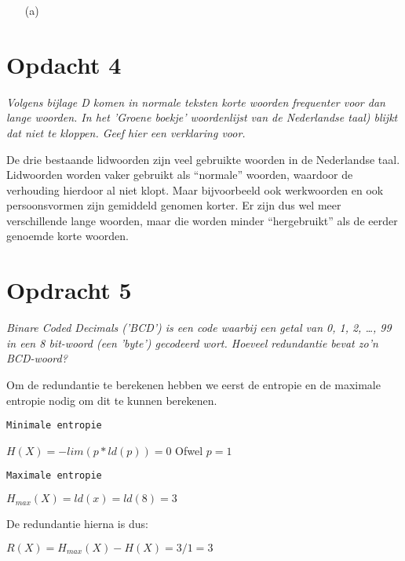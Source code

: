 \begin{itemize}
  \item[(a)]
\end{itemize}

\section{Opdacht 4}
\emph{Volgens bijlage D komen in normale teksten korte woorden frequenter voor dan lange woorden. In het 'Groene boekje' woordenlijst van de Nederlandse taal) blijkt dat niet te kloppen.  Geef hier een verklaring voor.}

De drie bestaande lidwoorden zijn veel gebruikte woorden in de Nederlandse taal. Lidwoorden worden vaker gebruikt als ``normale'' woorden, waardoor de verhouding hierdoor al niet klopt. Maar bijvoorbeeld ook werkwoorden en ook persoonsvormen zijn gemiddeld genomen korter. Er zijn dus wel meer verschillende lange woorden, maar die worden minder ``hergebruikt'' als de eerder genoemde korte woorden. 

\section{Opdracht 5}
\emph{Binare Coded Decimals ('BCD') is een code waarbij een getal van 0, 1, 2, \ldots, 99 in een 8 bit-woord (een '\emph{byte}') gecodeerd wort. Hoeveel redundantie bevat zo'n BCD-woord?}

Om de redundantie te berekenen hebben we eerst de entropie en de maximale entropie nodig om dit te kunnen berekenen.

\texttt{Minimale entropie}

$H(X)=-lim(p*ld(p))=0$
Ofwel
$p=1$

\texttt{Maximale entropie}

$H_{max}(X)=ld(x)=ld(8)=3$

De redundantie hierna is dus:

$R(X)=H_{max}(X)-H(X)=3/1=3$
